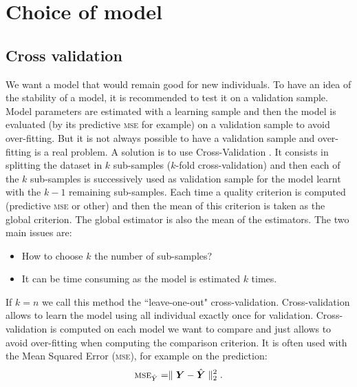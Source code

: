 \documentclass[12pt,a4paper]{report}
\begin{document}
\section{Choice of model}
			\subsection{Cross validation}
				
				We want a model that would remain good for new individuals. To have an idea of the stability of a model, it is recommended to test it on a validation sample. Model parameters are estimated with a learning sample and then the model is evaluated (by its predictive \textsc{mse} for example) on a validation sample to avoid over-fitting. But it is not always possible to have a validation sample and over-fitting is a real problem. A solution is to use Cross-Validation \cite{kohavi1995study,arlot2010survey}. It consists in splitting the dataset in $k$ sub-samples ($k$-fold cross-validation) and then each of the $k$ sub-samples is successively used as validation sample for the model learnt with the $k-1$ remaining sub-samples. Each time a quality criterion  is computed (predictive \textsc{mse} or other) and then the mean of this criterion is taken as the global criterion. The global estimator is also the mean of the estimators. The two main issues are:
				\begin{itemize}
					\item How to choose $k$ the number of sub-samples?
					\item It can be time consuming as the model is estimated $k$ times.
				\end{itemize}
				If $k=n$ we call this method the ``leave-one-out" cross-validation.
				Cross-validation allows to learn the model using all individual exactly once for validation.
				Cross-validation is computed on each model we want to compare and just allows to avoid over-fitting when computing the comparison criterion.
				It is often used with the Mean Squared Error (\textsc{mse}), for example on the prediction:
				\begin{equation}
					\textsc{mse}_{\hat{Y}}=\parallel \boldsymbol{Y}-\hat{\boldsymbol{Y}} \parallel^2_2 .
				\end{equation}
\end{document}

